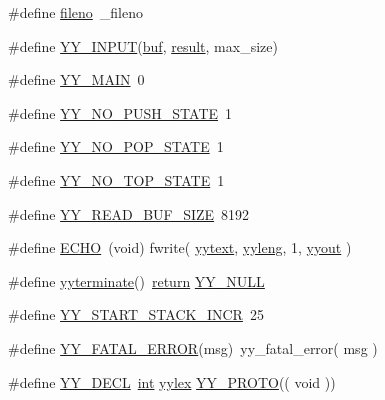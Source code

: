 \begin{DoxyCompactItemize}
\item 
\#define \mbox{\hyperlink{expr-lex_8cpp_a2c12e4b6615ac6838a99d5b6fa619683}{fileno}}~\+\_\+fileno
\item 
\#define \mbox{\hyperlink{expr-lex_8cpp_aacfdca45fa4beb8b06172525a53c424a}{Y\+Y\+\_\+\+I\+N\+P\+UT}}(\mbox{\hyperlink{expr-lex_8cpp_aaaf5379ca5750ed4ef26a247cca0103c}{buf}},  \mbox{\hyperlink{expr_8cpp_a8ad9a782076057c9c0a54c3a233468d4}{result}},  max\+\_\+size)
\item 
\#define \mbox{\hyperlink{expr-lex_8cpp_a4c49735b8f960c5801812993b6f787b7}{Y\+Y\+\_\+\+M\+A\+IN}}~0
\item 
\#define \mbox{\hyperlink{expr-lex_8cpp_a38e3a1cf6bfd339e7cfe0370e245730f}{Y\+Y\+\_\+\+N\+O\+\_\+\+P\+U\+S\+H\+\_\+\+S\+T\+A\+TE}}~1
\item 
\#define \mbox{\hyperlink{expr-lex_8cpp_ab99a7dbce52206f2cee91121f70f3f98}{Y\+Y\+\_\+\+N\+O\+\_\+\+P\+O\+P\+\_\+\+S\+T\+A\+TE}}~1
\item 
\#define \mbox{\hyperlink{expr-lex_8cpp_ac3eedc6d2e3e4c9b2bacd0f1ebeab98a}{Y\+Y\+\_\+\+N\+O\+\_\+\+T\+O\+P\+\_\+\+S\+T\+A\+TE}}~1
\item 
\#define \mbox{\hyperlink{expr-lex_8cpp_aab1491ceccb1c95c14320b2903773a1c}{Y\+Y\+\_\+\+R\+E\+A\+D\+\_\+\+B\+U\+F\+\_\+\+S\+I\+ZE}}~8192
\item 
\#define \mbox{\hyperlink{expr-lex_8cpp_aad1dc60a04a1d8cfc8b3ded13601e361}{E\+C\+HO}}~(void) fwrite( \mbox{\hyperlink{expr_node_8cpp_ad9264b77d56b6971f29739e2bda77f51}{yytext}}, \mbox{\hyperlink{expr-lex_8cpp_a1b5865350b5ca5c1d69f429c2a652953}{yyleng}}, 1, \mbox{\hyperlink{expr-lex_8cpp_a296847b42b0baa62e2af36cb79f3c0eb}{yyout}} )
\item 
\#define \mbox{\hyperlink{expr-lex_8cpp_ac3286b18a2e91b4571b97df96a118e84}{yyterminate}}()~\mbox{\hyperlink{gb_codes_c_b_8h_a9717e7bbecb906637e86cef6da3d83c2}{return}} \mbox{\hyperlink{expr-lex_8cpp_a8e0bcf8f8a5b613ea583347f8bc31cbf}{Y\+Y\+\_\+\+N\+U\+LL}}
\item 
\#define \mbox{\hyperlink{expr-lex_8cpp_a227e75c43b9e0cd41529974230be7e75}{Y\+Y\+\_\+\+S\+T\+A\+R\+T\+\_\+\+S\+T\+A\+C\+K\+\_\+\+I\+N\+CR}}~25
\item 
\#define \mbox{\hyperlink{expr-lex_8cpp_ac0586b8b0b092d02f4ba7d45abe328f2}{Y\+Y\+\_\+\+F\+A\+T\+A\+L\+\_\+\+E\+R\+R\+OR}}(msg)~yy\+\_\+fatal\+\_\+error( msg )
\item 
\#define \mbox{\hyperlink{expr-lex_8cpp_ae5b01ac2fa5a6ad5fb97559638abe686}{Y\+Y\+\_\+\+D\+E\+CL}}~\mbox{\hyperlink{_util_8cpp_a0ef32aa8672df19503a49fab2d0c8071}{int}} \mbox{\hyperlink{expr_8cpp_aa40b27ae32d6d1ae7160bd6256e08eb8}{yylex}} \mbox{\hyperlink{expr-lex_8cpp_a0a2ce3902c765bc21ae783522d579223}{Y\+Y\+\_\+\+P\+R\+O\+TO}}(( void ))

\end{DoxyCompactItemize}
